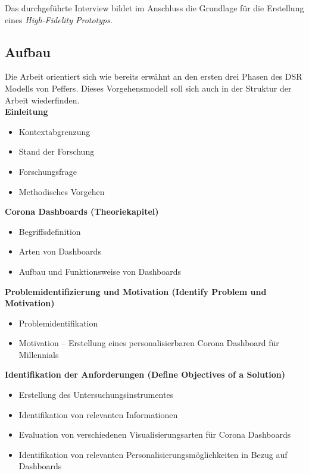 \documentclass[12pt, oneside]{article}
\begin{document}
Das durchgeführte Interview bildet im Anschluss die Grundlage für die Erstellung eines \textit{High-Fidelity Prototyps}.


\clearpage
\subsection{Aufbau}
Die Arbeit orientiert sich wie bereits erwähnt an den ersten drei Phasen des DSR Modells von Peffers. Dieses Vorgehensmodell soll sich auch in der Struktur der Arbeit wiederfinden.\\

\textbf{Einleitung}
\begin{itemize}
    \item Kontextabgrenzung
    \item Stand der Forschung
    \item Forschungsfrage
    \item Methodisches Vorgehen\\
\end{itemize}

\textbf{Corona Dashboards (Theoriekapitel)}
\begin{itemize}
    \item Begriffsdefinition
    \item Arten von Dashboards
    \item Aufbau und Funktionsweise von Dashboards\\
\end{itemize}


\textbf{Problemidentifizierung und Motivation (Identify Problem und Motivation)}
\begin{itemize}
    \item Problemidentifikation
    \item Motivation – Erstellung eines personalisierbaren Corona Dashboard für Millennials\\
\end{itemize}

\textbf{Identifikation der Anforderungen (Define Objectives of a Solution)}
\begin{itemize}
    \item Erstellung des Untersuchungsinstrumentes
    \item Identifikation von relevanten Informationen
    \item Evaluation von verschiedenen Visualisierungsarten für Corona Dashboards
    \item Identifikation von relevanten Personalisierungsmöglichkeiten in Bezug auf Dashboards\\
\end{itemize}
\end{document}
